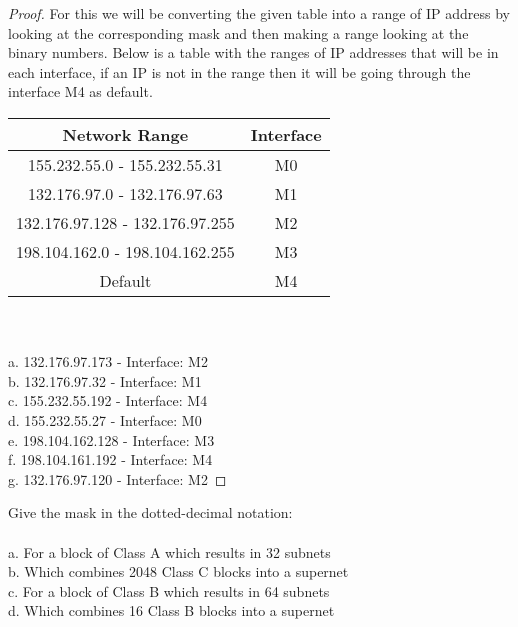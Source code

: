 \documentclass[12pt]{article}
\newenvironment{exercise}[2][Exercise]{\begin{trivlist}
\item[\hskip \labelsep {\bfseries #1}\hskip \labelsep {\bfseries #2.}]}{\end{trivlist}}
\begin{document}
\begin{proof}
For this we will be converting the given table into a range of IP address by looking at the corresponding mask and then making a range looking at the binary numbers. Below is a table with the ranges of IP addresses that will be in each interface, if an IP is not in the range then it will be going through the interface M4 as default. \\ 
\begin{center}
\begin{tabular}{ |c|c| } 
 \hline
 Network Range & Interface \\ 
 \hline 
 155.232.55.0 - 155.232.55.31 & M0 \\
 \hline 
 132.176.97.0 - 132.176.97.63 & M1 \\
 \hline 
 132.176.97.128 - 132.176.97.255 & M2 \\
 \hline 
 198.104.162.0 - 198.104.162.255 & M3 \\ 
 \hline 
 Default & M4 \\
 \hline
\end{tabular}
\end{center}
\\ \\
a. 132.176.97.173 - Interface: M2\\
b. 132.176.97.32 - Interface: M1\\
c. 155.232.55.192 - Interface: M4\\
d. 155.232.55.27 - Interface: M0 \\
e. 198.104.162.128 - Interface: M3\\
f. 198.104.161.192 - Interface: M4\\
g. 132.176.97.120 - Interface: M2
\end{proof}

\begin{exercise}{7}
Give the mask in the dotted-decimal notation: \\ \\
a. For a block of Class A which results in 32 subnets \\ 
b. Which combines 2048 Class C blocks into a supernet \\ 
c. For a block of Class B which results in 64 subnets \\ 
d. Which combines 16 Class B blocks into a supernet 
\end{exercise}
\end{document}
